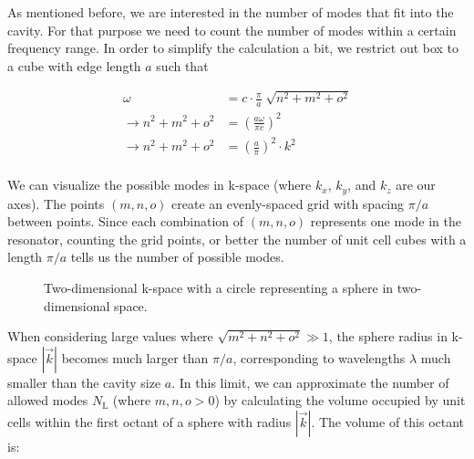 \documentclass[
  a4paper,
]{book}
\begin{document}
As mentioned before, we are interested in the number of modes that fit
into the cavity. For that purpose we need to count the number of modes
within a certain frequency range. In order to simplify the calculation a
bit, we restrict out box to a cube with edge length \(a\) such that

\[
\begin{aligned}
\omega & =  c \cdot \frac{\pi}{a} \; \sqrt{ n^2 + m^2 + o^2}\\
\rightarrow n^2 + m^2 + o^2 & =  \left( \frac{a \omega}{\pi c}\right)^2\\
\rightarrow n^2 + m^2 + o^2 & =  \left( \frac{a}{\pi}\right)^2 \cdot k^2\\
\end{aligned}
\]

We can visualize the possible modes in k-space (where \(k_x\), \(k_y\),
and \(k_z\) are our axes). The points \((m,n,o)\) create an
evenly-spaced grid with spacing \(\pi/a\) between points. Since each
combination of \((m,n,o)\) represents one mode in the resonator,
counting the grid points, or better the number of unit cell cubes with a
length \(\pi/a\) tells us the number of possible modes.

\begin{figure}


\caption{\label{fig-cavity-resonator-k-space}Two-dimensional k-space
with a circle representing a sphere in two-dimensional space.}

\end{figure}%

When considering large values where \(\sqrt{m^2 +n^2 +o^2} \gg 1\), the
sphere radius in k-space \(\left| \vec{k} \right|\) becomes much larger
than \(\pi / a\), corresponding to wavelengths \(\lambda\) much smaller
than the cavity size \(a\). In this limit, we can approximate the number
of allowed modes \(N_{\mathrm{L}}\) (where \(m,n,o > 0\)) by calculating
the volume occupied by unit cells within the first octant of a sphere
with radius \(\left| \vec{k} \right|\). The volume of this octant is:
\end{document}
